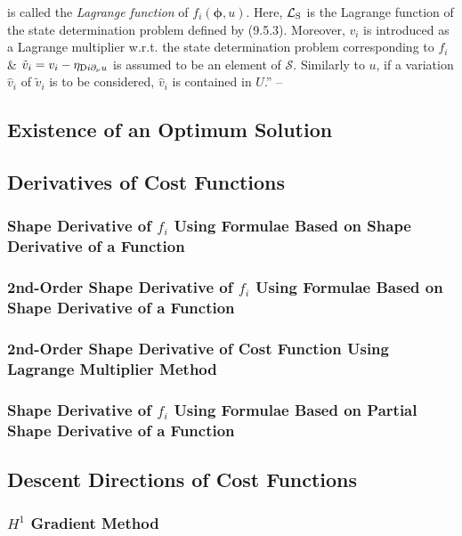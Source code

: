 \documentclass[oneside]{book}
\numberwithin{equation}{section}
\begin{document}
is called the \textit{Lagrange function} of $f_i(\boldsymbol{\phi},u)$. Here, $\mathcal{L}_{\rm S}$ is the Lagrange function of the state determination problem defined by (9.5.3). Moreover, $v_i$ is introduced as a Lagrange multiplier w.r.t. the state determination problem corresponding to $f_i$ \& $\tilde{v}_i = v_i - \eta_{{\rm D}i\partial_\nu u}$ is assumed to be an element of $\mathcal{S}$. Similarly to $u$, if a variation $\hat{v}_i$ of $\tilde{v}_i$ is to be considered, $\hat{v}_i$ is contained in $U$.'' -- \cite[pp. 467--469]{Azegami2020}

\subsection{Existence of an Optimum Solution}

\subsection{Derivatives of Cost Functions}

\subsubsection{Shape Derivative of $f_i$ Using Formulae Based on Shape Derivative of a Function}

\subsubsection{2nd-Order Shape Derivative of $f_i$ Using Formulae Based on Shape Derivative of a Function}

\subsubsection{2nd-Order Shape Derivative of Cost Function Using Lagrange Multiplier Method}

\subsubsection{Shape Derivative of $f_i$ Using Formulae Based on Partial Shape Derivative of a Function}

\subsection{Descent Directions of Cost Functions}

\subsubsection{$H^1$ Gradient Method}
\end{document}

